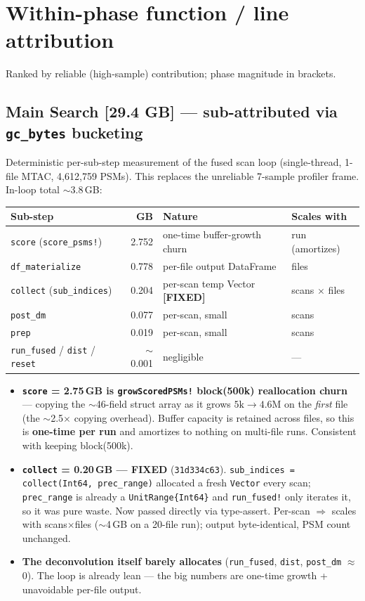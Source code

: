 \documentclass[11pt]{article}
\newcommand{\code}[1]{\texttt{\small #1}}
\begin{document}
\section{Within-phase function / line attribution}
Ranked by reliable (high-sample) contribution; phase magnitude in brackets.

\subsection*{Main Search [29.4 GB] --- sub-attributed via \code{gc\_bytes} bucketing}
Deterministic per-sub-step measurement of the fused scan loop (single-thread,
1-file MTAC, 4{,}612{,}759 PSMs). This replaces the unreliable 7-sample profiler
frame. In-loop total $\sim$3.8\,GB:
\begin{center}
\begin{tabular}{lrll}
\toprule
\textbf{Sub-step} & \textbf{GB} & \textbf{Nature} & \textbf{Scales with} \\
\midrule
\code{score} (\code{score\_psms!}) & 2.752 & one-time buffer-growth churn & run (amortizes) \\
\code{df\_materialize}             & 0.778 & per-file output DataFrame     & files \\
\code{collect} (\code{sub\_indices}) & 0.204 & per-scan temp Vector \textbf{[FIXED]} & scans $\times$ files \\
\code{post\_dm}                    & 0.077 & per-scan, small               & scans \\
\code{prep}                        & 0.019 & per-scan, small               & scans \\
\code{run\_fused} / \code{dist} / \code{reset} & $\sim$0.001 & negligible & --- \\
\bottomrule
\end{tabular}
\end{center}
\begin{itemize}
  \item \textbf{\code{score} = 2.75\,GB is \code{growScoredPSMs!} block(500k)
  reallocation churn} --- copying the $\sim$46-field struct array as it grows
  $5\text{k}\rightarrow4.6\text{M}$ on the \emph{first} file (the $\sim$2.5$\times$
  copying overhead). Buffer capacity is retained across files, so this is
  \textbf{one-time per run} and amortizes to nothing on multi-file runs. Consistent
  with keeping block(500k).
  \item \textcolor{hi}{\textbf{\code{collect} = 0.20\,GB --- FIXED}} (\code{31d334c63}).
  \code{sub\_indices = collect(Int64, prec\_range)} allocated a fresh \code{Vector}
  every scan; \code{prec\_range} is already a \code{UnitRange\{Int64\}} and
  \code{run\_fused!} only iterates it, so it was pure waste. Now passed directly via
  type-assert. Per-scan $\Rightarrow$ scales with scans$\times$files ($\sim$4\,GB on
  a 20-file run); output byte-identical, PSM count unchanged.
  \item \textbf{The deconvolution itself barely allocates} (\code{run\_fused},
  \code{dist}, \code{post\_dm} $\approx$ 0). The loop is already lean --- the big
  numbers are one-time growth + unavoidable per-file output.
\end{itemize}
\end{document}
